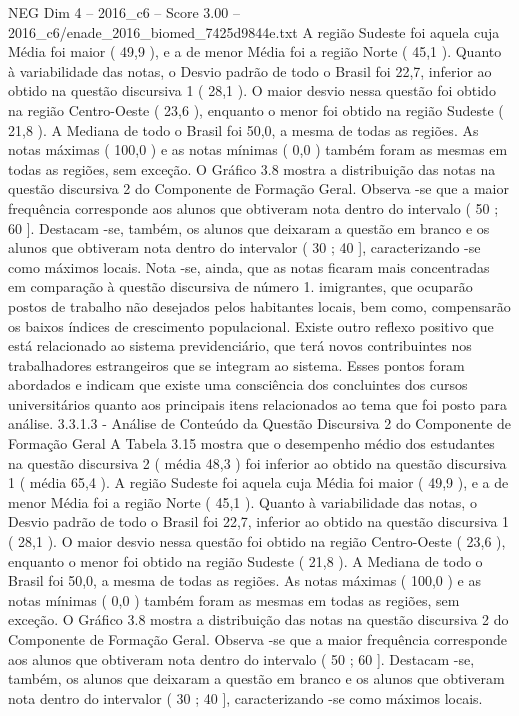 \begin{textsample}{NEG Dim 4 – 2016\_c6 – Score 3.00 – 2016\_c6/enade\_2016\_biomed\_7425d9844e.txt}
A região Sudeste foi aquela cuja Média foi maior ( 49,9 ), e a de menor Média foi a região Norte ( 45,1 ).
Quanto à variabilidade das notas, o Desvio padrão de todo o Brasil foi 22,7, inferior ao obtido na questão discursiva 1 ( 28,1 ).
O maior desvio nessa questão foi obtido na região Centro-Oeste ( 23,6 ), enquanto o menor foi obtido na região Sudeste ( 21,8 ).
A Mediana de todo o Brasil foi 50,0, a mesma de todas as regiões.
As notas máximas ( 100,0 ) e as notas mínimas ( 0,0 ) também foram as mesmas em todas as regiões, sem exceção.
O Gráfico 3.8 mostra a distribuição das notas na questão discursiva 2 do Componente de Formação Geral.
Observa -se que a maior frequência corresponde aos alunos que obtiveram nota dentro do intervalo ( 50 ; 60 ].
Destacam -se, também, os alunos que deixaram a questão em branco e os alunos que obtiveram nota dentro do intervalor ( 30 ; 40 ], caracterizando -se como máximos locais.
Nota -se, ainda, que as notas ficaram mais concentradas em comparação à questão discursiva de número 1. imigrantes, que ocuparão postos de trabalho não desejados pelos habitantes locais, bem como, compensarão os baixos índices de crescimento populacional.
Existe outro reflexo positivo que está relacionado ao sistema previdenciário, que terá novos contribuintes nos trabalhadores estrangeiros que se integram ao sistema.
Esses pontos foram abordados e indicam que existe uma consciência dos concluintes dos cursos universitários quanto aos principais itens relacionados ao tema que foi posto para análise. 3.3.1.3 - Análise de Conteúdo da Questão Discursiva 2 do Componente de Formação Geral A Tabela 3.15 mostra que o desempenho médio dos estudantes na questão discursiva 2 ( média 48,3 ) foi inferior ao obtido na questão discursiva 1 ( média 65,4 ).
A região Sudeste foi aquela cuja Média foi maior ( 49,9 ), e a de menor Média foi a região Norte ( 45,1 ).
Quanto à variabilidade das notas, o Desvio padrão de todo o Brasil foi 22,7, inferior ao obtido na questão discursiva 1 ( 28,1 ).
O maior desvio nessa questão foi obtido na região Centro-Oeste ( 23,6 ), enquanto o menor foi obtido na região Sudeste ( 21,8 ).
A Mediana de todo o Brasil foi 50,0, a mesma de todas as regiões.
As notas máximas ( 100,0 ) e as notas mínimas ( 0,0 ) também foram as mesmas em todas as regiões, sem exceção.
O Gráfico 3.8 mostra a distribuição das notas na questão discursiva 2 do Componente de Formação Geral.
Observa -se que a maior frequência corresponde aos alunos que obtiveram nota dentro do intervalo ( 50 ; 60 ].
Destacam -se, também, os alunos que deixaram a questão em branco e os alunos que obtiveram nota dentro do intervalor ( 30 ; 40 ], caracterizando -se como máximos locais.

\end{textsample}
